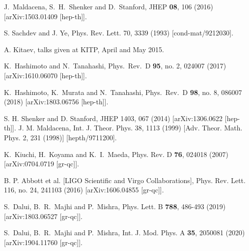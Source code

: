 \documentclass[aps,prd,showpacs,nofootinbib,floats,floatfix,preprintnumbers,groupedaddress,twocolumn]{revtex4-1}
\begin{document}
\begin{thebibliography}{9}
J.~Maldacena, S.~H.~Shenker and D.~Stanford,
JHEP \textbf{08}, 106 (2016)
[arXiv:1503.01409 [hep-th]].

 S. Sachdev and J. Ye, Phys. Rev. Lett. 70, 3339 (1993)
[cond-mat/9212030].


 A. Kitaev, talks given at KITP, April and May 2015.

  K.~Hashimoto and N.~Tanahashi,
  Phys.\ Rev.\ D {\bf 95}, no. 2, 024007 (2017)
  [arXiv:1610.06070 [hep-th]].

K.~Hashimoto, K.~Murata and N.~Tanahashi,
Phys.\ Rev.\ D {\bf 98}, no. 8, 086007 (2018)
[arXiv:1803.06756 [hep-th]].

 S. H. Shenker and D. Stanford, JHEP 1403, 067 (2014)
[arXiv:1306.0622 [hep-th]].
 J. M. Maldacena, Int. J. Theor. Phys. 38, 1113
(1999) [Adv. Theor. Math. Phys. 2, 231 (1998)] [hepth/9711200].

K.~Kiuchi, H.~Koyama and K.~I.~Maeda,
Phys. Rev. D \textbf{76}, 024018 (2007)
[arXiv:0704.0719 [gr-qc]].

 B. P. Abbott et al. [LIGO Scientific and Virgo Collaborations], Phys. Rev. Lett. 116, no. 24, 241103 (2016)
[arXiv:1606.04855 [gr-qc]].

 S.~Dalui, B.~R.~Majhi and P.~Mishra,
Phys. Lett. B \textbf{788}, 486-493 (2019)
[arXiv:1803.06527 [gr-qc]].

S.~Dalui, B.~R.~Majhi and P.~Mishra,
Int. J. Mod. Phys. A \textbf{35}, 2050081 (2020)
[arXiv:1904.11760 [gr-qc]].


\end{thebibliography}
\end{document}
